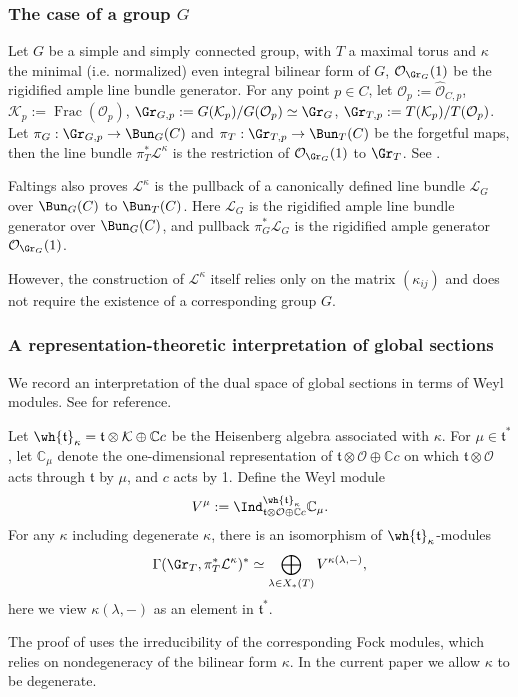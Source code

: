 \documentclass{amsart}
\numberwithin{equation}{section}
\numberwithin{figure}{section}
\theoremstyle{definition}
\theoremstyle{remark}
\renewcommand{\c}[1]{\mathcal{#1}}
\renewcommand{\b}[1]{\mathbb{#1}}
\newcommand{\f}[1]{\mathfrak{#1}}
\begin{document}
\subsubsection{The case of a group $G$}
 Let $G$ be a simple and simply connected group, with $T$  a maximal torus and $\kappa$ the minimal (i.e. normalized) even integral bilinear form of $G$, $\c O_{\Gr_G}(1)$ be the rigidified ample line bundle generator.
 For any point $p\in C$, let 
 $\c O_p:=\widehat{\c O}_{C,p}$, $\c K_p:=\operatorname{Frac}(\c O_p)$,  $\Gr_{G,p}:=G(\c K_p)/G(\c O_p)\simeq\Gr_G$, $\Gr_{T,p}:=T(\c K_p)/T(\c O_p)$.
 Let  $\pi_G: \Gr_{G,p}\to \Bun_G(C)$ and  $\pi_T: \Gr_{T,p}\to \Bun_T(C)$ be the forgetful maps, then
 the line bundle  $\pi_T^*\c L^\kappa$ is the restriction of  $\c O_{\Gr_G}(1)$ to $\Gr_T$. See \cite[Theorem 17]{faltings2003algebraic}.
 
  Faltings also proves $\c L^\kappa$ is the pullback of a canonically defined line bundle $\c L_G$ over $\Bun_G(C)$ to $\Bun_T(C)$. Here $\c L_G$ is the rigidified ample line bundle generator over $\Bun_G(C)$, and pullback $\pi_G^*\c L_G$ is the rigidified ample generator $\c O_{\Gr_G}(1)$.
  
 
 
However, the construction of $\c{L}^\kappa$ itself relies only on the matrix $(\kappa_{ij})$ and does not require the existence of a corresponding group $G$.

\subsubsection{A representation-theoretic interpretation of global sections}
\label{Fock}
We record an interpretation of the dual space of global sections in terms of Weyl modules. See \cite[\S17.1]{GaitsgoryCFT} for reference.

Let $\wh{\f t}_\kappa=\f t\otimes\c K\oplus\b Cc$ be the Heisenberg algebra associated with $\kappa$. For $\mu\in\f t^*$, let $\b C_\mu$ denote the one-dimensional representation of $\f t\otimes\c O\oplus\b Cc$ on which $\f t\otimes\c O$ acts through $\f t$ by $\mu$, and $c$ acts by 1. Define the Weyl module
\[
V^\mu
:=
\Ind^{\wh{\f t}_\kappa}_{\f t\otimes\c O\oplus\b Cc}
\b C_\mu.
\]
For any $\kappa$ including degenerate $\kappa$, there is an isomorphism of $\wh{\f t}_\kappa$-modules
\[
\Gamma(\Gr_T,\pi_T^*\c L^\kappa)^*
\simeq
\bigoplus_{\lambda\in X_*(T)}
V^{\kappa(\lambda,-)},
\]
here we view $\kappa(\lambda,-)$ as an element in $\f t^*$.

The proof of \cite[Proposition 2.1.1]{zhu2009affine} uses the irreducibility of the corresponding Fock modules, which relies on nondegeneracy of the bilinear form $\kappa$. In the current paper we allow $\kappa$ to be degenerate.
\end{document}
